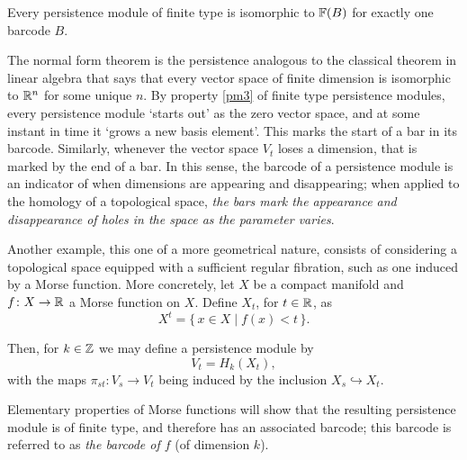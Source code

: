 \begin{theorem}
Every persistence module of finite type is isomorphic to $\mathbb{F}(B)$ for exactly one barcode $B$.
\end{theorem}

The normal form theorem is the persistence analogous to the classical theorem in linear algebra that says that every vector space of finite dimension is isomorphic to $\mathbb{R}^n$ for some unique $n$. By property \ref{pm3} of finite type persistence modules, every persistence module `starts out' as the zero vector space, and at some instant in time it `grows a new basis element'. This marks the start of a bar in its barcode. Similarly, whenever the vector space $V_t$ loses a dimension, that is marked by the end of a bar. In this sense, the barcode of a persistence module is an indicator of when dimensions are appearing and disappearing; when applied to the homology of a topological space, \emph{the bars mark the appearance and disappearance of holes in the space as the parameter varies}.

\medskip

Another example, this one of a more geometrical nature, consists of considering a topological space equipped with a sufficient regular fibration, such as one induced by a Morse function. More concretely, let $X$ be a compact manifold and $f \colon X \to \mathbb{R}$ a Morse function on $X$. Define $X_t$, for $t \in \mathbb{R}$, as
\begin{equation}
X^t = \{\, x \in X \mid f(x) < t \,\}.
\end{equation}

Then, for $k \in \mathbb{Z}$ we may define a persistence module by
\begin{equation}
V_t = H_k(X_t),
\end{equation}
with the maps $\pi_{st} \colon V_s \to V_t$ being induced by the inclusion $X_s \hookrightarrow X_t$.

Elementary properties of Morse functions will show that the resulting persistence module is of finite type, and therefore has an associated barcode; this barcode is referred to as \emph{the barcode of $f$} (of dimension $k$).

